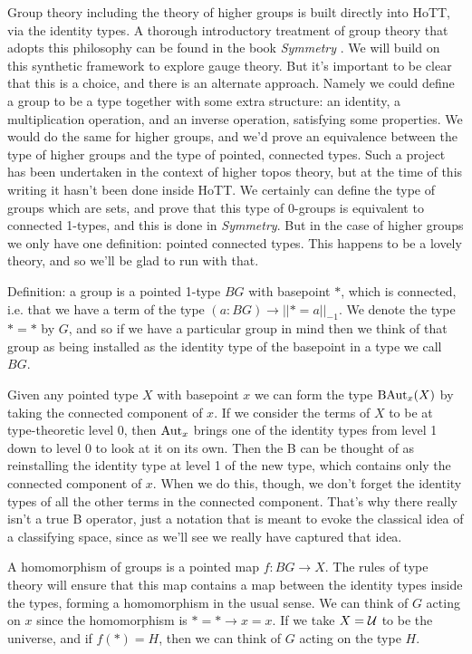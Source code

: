 \documentclass[12pt]{report}
\begin{document}
Group theory including the theory of higher groups is built directly into HoTT, via the identity types. A thorough introductory treatment of group theory that adopts this philosophy can be found in the book \emph{Symmetry} \cite{Symmetry}. We will build on this synthetic framework to explore gauge theory. But it's important to be clear that this is a choice, and there is an alternate approach. Namely we could define a group to be a type together with some extra structure: an identity, a multiplication operation, and an inverse operation, satisfying some properties. We would do the same for higher groups, and we'd prove an equivalence between the type of higher groups and the type of pointed, connected types. Such a project has been undertaken in the context of higher topos theory, but at the time of this writing it hasn't been done inside HoTT. We certainly can define the type of groups which are sets, and prove that this type of 0-groups is equivalent to connected 1-types, and this is done in \emph{Symmetry}. But in the case of higher groups we only have one definition: pointed connected types. This happens to be a lovely theory, and so we'll be glad to run with that.

Definition: a group is a pointed 1-type $BG$ with basepoint $*$, which is connected, i.e. that we have a term of the type $(a:BG)\to||*=a||_{-1}$. We denote the type $*=*$ by $G$, and so if we have a particular group in mind then we think of that group as being installed as the identity type of the basepoint in a type we call $BG$.

Given any pointed type $X$ with basepoint $x$ we can form the type $\mathrm{BAut}_x(X)$ by taking the connected component of $x$. If we consider the terms of $X$ to be at type-theoretic level 0, then $\mathrm{Aut}_x$ brings one of the identity types from level 1 down to level 0 to look at it on its own. Then the B can be thought of as reinstalling the identity type at level 1 of the new type, which contains only the connected component of $x$. When we do this, though, we don't forget the identity types of all the other terms in the connected component. That's why there really isn't a true B operator, just a notation that is meant to evoke the classical idea of a classifying space, since as we'll see we really have captured that idea.

A homomorphism of groups is a pointed map $f:BG\to X$. The rules of type theory will ensure that this map contains a map between the identity types inside the types, forming a homomorphism in the usual sense. We can think of $G$ acting on $x$ since the homomorphism is $*=*\to x=x$. If we take $X=\mathcal{U}$ to be the universe, and if $f(*)=H$, then we can think of $G$ acting on the type $H$.
\end{document}
